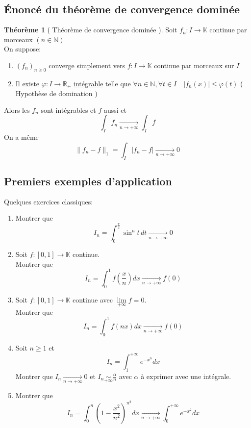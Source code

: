 \documentclass[10pt,a4paper]{article}
\theoremstyle{definition}
\newtheorem{theorem}[proposition]{Théorème}
\begin{document}
\subsection{Énoncé du théorème de convergence dominée}
\begin{theorem}[ Théorème de convergence dominée ]
    Soit \(f_n: I \to \mathbb{K}\) continue par morceaux \((n \in \mathbb{N})\) \\
    On suppose:
    \begin{enumerate}
        \item \((f_n)_{n \geq 0}\) converge simplement vers \(f: I \to \mathbb{K}\) continue par morceaux sur \(I\)
        \item Il existe \(\varphi: I \to \mathbb{R}_+\) \uline{intégrable} telle que \(\forall n \in \mathbb{N}, \forall t \in I \quad |f_n(x)| \leq \varphi(t)\) ( Hypothèse de domination )
    \end{enumerate}
    Alors les \(f_n\) sont intégrables et \(f\) aussi et
    \[\boxed{\int_{I}f_n \xrightarrow[n \to +\infty]{} \int_{I}f}\]
    On a même
    \[\lVert f_n - f \rVert_1 = \int_{I}|f_n - f| \xrightarrow[n \to +\infty]{} 0\]
\end{theorem}

\subsection{Premiers exemples d'application}
\noindent Quelques exercices classiques:
\begin{enumerate}
    \item Montrer que \[I_n = \int_{0}^{\frac{\pi}{2}} \sin^{n}t \,dt \xrightarrow[n \to +\infty]{} 0\]
    \item Soit \(f: [0, 1] \to \mathbb{K}\) continue. \\ Montrer que \[I_n = \int_{0}^{1} f\left(\frac{x}{n}\right) dx \xrightarrow[n \to +\infty]{} f(0)\]
    \item Soit \(f: [0, 1] \to \mathbb{K}\) continue avec \(\lim\limits_{+\infty}f = 0\). \\ Montrer que \[I_n = \int_{0}^{1} f(nx) dx \xrightarrow[n \to +\infty]{} f(0)\]
    \item Soit \(n \geq 1\) et \[I_n = \int_{1}^{+\infty}e^{-x^{n}} dx\] Montrer que \(I_n \xrightarrow[n \to +\infty]{} 0\) et \(I_n \underset{+\infty}{\sim} \frac{\alpha}{n}\) avec \(\alpha\) à exprimer avec une intégrale.
    \item Montrer que \[I_n = \int_{0}^{n}\left(1 - \frac{x^2}{n^2}\right)^{n^2} dx \xrightarrow[n \to +\infty]{} \int_{0}^{+\infty}e^{-x^2} dx\]
\end{enumerate}
\end{document}
